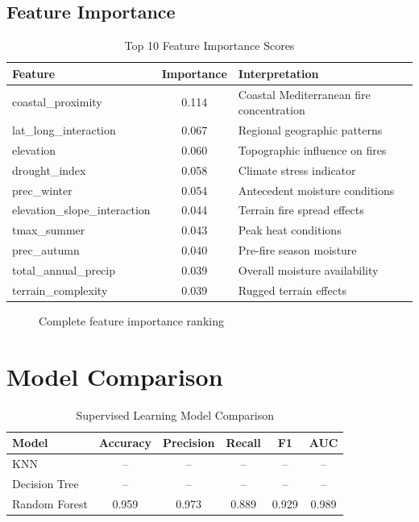 \subsection*{Feature Importance}
\begin{table}[H]
\centering
\caption{Top 10 Feature Importance Scores}
\label{tab:rf_importance}
\begin{tabular}{|l|c|l|}
\hline
\textbf{Feature} & \textbf{Importance} & \textbf{Interpretation} \\
\hline
coastal\_proximity & 0.114 & Coastal Mediterranean fire concentration \\
lat\_long\_interaction & 0.067 & Regional geographic patterns \\
elevation & 0.060 & Topographic influence on fires \\
drought\_index & 0.058 & Climate stress indicator \\
prec\_winter & 0.054 & Antecedent moisture conditions \\
elevation\_slope\_interaction & 0.044 & Terrain fire spread effects \\
tmax\_summer & 0.043 & Peak heat conditions \\
prec\_autumn & 0.040 & Pre-fire season moisture \\
total\_annual\_precip & 0.039 & Overall moisture availability \\
terrain\_complexity & 0.039 & Rugged terrain effects \\
\hline
\end{tabular}
\end{table}

\begin{figure}[H]
    \centering
    \caption{Complete feature importance ranking}
    \label{fig:rf_importance}
\end{figure}

\section{Model Comparison}

\begin{table}[H]
\centering
\caption{Supervised Learning Model Comparison}
\label{tab:model_comparison}
\begin{tabular}{|l|c|c|c|c|c|}
\hline
\textbf{Model} & \textbf{Accuracy} & \textbf{Precision} & \textbf{Recall} & \textbf{F1} & \textbf{AUC} \\
\hline
KNN & -- & -- & -- & -- & -- \\
Decision Tree & -- & -- & -- & -- & -- \\
Random Forest & 0.959 & 0.973 & 0.889 & 0.929 & 0.989 \\
\hline
\end{tabular}
\end{table}


